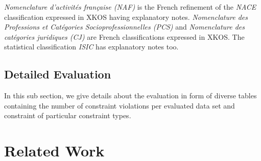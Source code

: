 \documentclass{llncs}
\newcommand*\rot{\rotatebox{90}}
\begin{document}
\emph{Nomenclature d'activités française (NAF)} is the French refinement of the \emph{NACE} classification expressed in XKOS having explanatory notes.
\emph{Nomenclature des Professions et Catégories Socioprofessionnelles (PCS)} and \emph{Nomenclature des catégories juridiques (CJ)} are French classifications expressed in XKOS.
The statistical classification \emph{ISIC} has explanatory notes too. 


\subsection{Detailed Evaluation}

In this sub section, we give details about the evaluation in form of diverse tables containing the number of constraint violations per evaluated data set and constraint of particular constraint types.

\section{Related Work}
\end{document}
